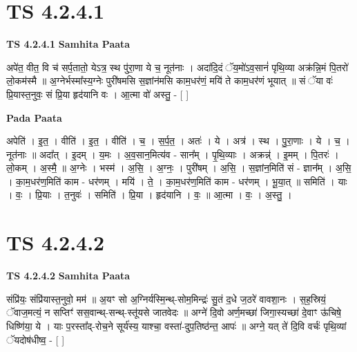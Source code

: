\documentclass[17pt]{extarticle}
\begin{document}
\section*{ TS 4.2.4.1 }

\textbf{TS 4.2.4.1 } \newline
\textbf{Samhita Paata} \newline

अपे॑त॒ वीत॒ वि च॑ सर्प॒तातो॒ येऽत्र॒ स्थ पु॑रा॒णा ये च॒ नूत॑नाः । अदा॑दि॒दं ॅय॒मो॑ऽव॒सानं॑ पृथि॒व्या अक्र॑न्नि॒मं पि॒तरो॑ लो॒कम॑स्मै ॥ अ॒ग्नेर्भस्मा᳚स्य॒ग्नेः पुरी॑षमसि स॒ज्ञांन॑मसि काम॒धर॑णं॒ मयि॑ ते काम॒धर॑णं भूयात् ॥ सं ॅया वः॑ प्रि॒यास्त॒नुवः॒ सं प्रि॒या हृद॑यानि वः । आ॒त्मा वो॑ अस्तु॒ - [  ] \newline

\textbf{Pada Paata} \newline

अपेति॑ । इ॒त॒ । वीति॑ । इ॒त॒ । वीति॑ । च॒ । स॒र्प॒त॒ । अतः॑ । ये । अत्र॑ । स्थ । पु॒रा॒णाः । ये । च॒ । नूत॑नाः ॥ अदा᳚त् । इ॒दम् । य॒मः । अ॒व॒सान॒मित्य॑व - सान᳚म् । पृ॒थि॒व्याः । अक्रन्न्॑ । इ॒मम् । पि॒तरः॑ । लो॒कम् । अ॒स्मै॒ ॥ अ॒ग्नेः । भस्म॑ । अ॒सि॒ । अ॒ग्नः॒ । पुरी॑षम् । अ॒सि॒ । स॒ज्ञांन॒मिति॑ सं - ज्ञान᳚म् । अ॒सि॒ । का॒म॒धर॑ण॒मिति॑ काम - धर॑णम् । मयि॑ । ते॒ । का॒म॒धर॑ण॒मिति॑ काम - धर॑णम् । भू॒या॒त् ॥ समिति॑ । याः । वः॒ । प्रि॒याः । त॒नुवः॑ । समिति॑ । प्रि॒या । हृद॑यानि । वः॒ ॥ आ॒त्मा । वः॒ । अ॒स्तु॒ ।  \newline




\section*{ TS 4.2.4.2 }

\textbf{TS 4.2.4.2 } \newline
\textbf{Samhita Paata} \newline

संप्रि॑यः॒ संप्रि॑यास्त॒नुवो॒ मम॑ ॥ अ॒यꣳ सो अ॒ग्निर्यस्मि॒न्थ्-सोम॒मिन्द्रः॑ सु॒तं द॒धे ज॒ठरे॑ वावशा॒नः । स॒ह॒स्रियं॒ ॅवाज॒मत्यं॒ न सप्तिꣳ॑ सस॒वान्थ्-सन्थ्-स्तू॑यसे जातवेदः ॥ अग्ने॑ दि॒वो अर्ण॒मच्छा॑ जिगा॒स्यच्छा॑ दे॒वाꣳ ऊ॑चिषे॒ धिष्णि॑या॒ ये । याः प॒रस्ता᳚द्-रोच॒ने सूर्य॑स्य॒ याश्चा॒ वस्ता॑-दुप॒तिष्ठ॑न्त॒ आपः॑ ॥ अग्ने॒ यत् ते॑ दि॒वि वर्चः॑ पृथि॒व्यां ॅयदोष॑धीष्व॒ - [  ] \newline
\end{document}
